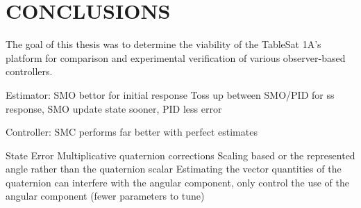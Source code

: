 \chapter{CONCLUSIONS}
\label{chap:Conclusions}

The goal of this thesis was to determine the viability of the TableSat 1A's platform for comparison and experimental verification of various observer-based controllers.


Estimator:
  SMO bettor for initial response
  Toss up between SMO/PID for ss response, SMO update state sooner, PID less error


Controller:
  SMC performs far better with perfect estimates


State Error
  Multiplicative quaternion corrections
  Scaling based or the represented angle rather than the quaternion scalar
  Estimating the vector quantities of the quaternion can interfere with the angular component, only control the use of the angular component (fewer parameters to tune)
